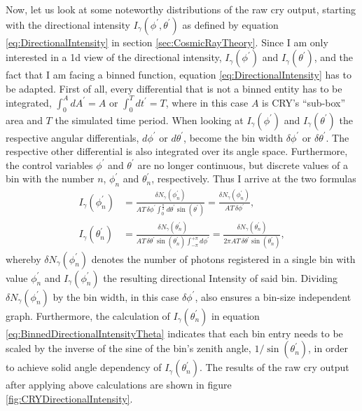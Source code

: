 Now, let us look at some noteworthy distributions of the raw \gls{cry} output, starting with the directional intensity $I_\gamma(\phi^{\prime},\theta^{\prime})$ as defined by equation \ref{eq:DirectionalIntensity} in section \ref{sec:CosmicRayTheory}. Since I am only interested in a \gls{1d} view of the directional intensity, \ie $I_\gamma(\phi^{\prime})$ and $I_\gamma(\theta^{\prime})$, and the fact that I am facing a binned function, equation \ref{eq:DirectionalIntensity} has to be adapted. First of all, every differential that is not a binned entity has to be integrated, \eg $\int_0^A dA^{\prime} = A$ or $\int_0^T dt^{\prime} = T$, where in this case $A$ is CRY's ``sub-box'' area and $T$ the simulated time period. When looking at $I_\gamma(\phi^{\prime})$ and $I_\gamma(\theta^{\prime})$ the respective angular differentials, $d\phi^{\prime}$ or $d\theta^{\prime}$, become the bin width $\delta\phi^{\prime}$ or $\delta\theta^{\prime}$. The respective other differential is also integrated over its angle space. Furthermore, the control variables $\phi^{\prime}$ and $\theta^{\prime}$ are no longer continuous, but discrete values of a bin with the number $n$, \ie $\phi^{\prime}_n$ and $\theta^{\prime}_n$, respectively. Thus I arrive at the two formulas
\begin{align}\label{eq:BinnedDirectionalIntensityPhi}
    I_\gamma(\phi^{\prime}_n) &= \frac{\delta N_\gamma(\phi^{\prime}_n)}{AT \, \delta\phi^{\prime} \int_{0}^{\frac{\pi}{2}}d\theta^{\prime}\sin{(\theta^{\prime})}} =\frac{\delta N_\gamma(\phi^{\prime}_n)}{AT \, \delta\phi^{\prime}}, \\[5pt]
    I_\gamma(\theta^{\prime}_n) &= \frac{\delta N_\gamma(\theta^{\prime}_n)}{AT\, \delta \theta^{\prime}\sin{(\theta^{\prime}_n)} \int_{-\pi}^{+\pi}d\phi^{\prime}} = \frac{\delta N_\gamma(\theta^{\prime}_n)}{2\pi AT\, \delta\theta^{\prime}\sin{(\theta^{\prime}_n)}},
    \label{eq:BinnedDirectionalIntensityTheta}
\end{align}
whereby $\delta N_\gamma(\phi^{\prime}_n)$ denotes the number of photons registered in a single bin with value $\phi^{\prime}_n$ and $I_\gamma(\phi^{\prime}_n)$ the resulting directional Intensity of said bin. Dividing $\delta N_\gamma(\phi^{\prime}_n)$ by the bin width, in this case $\delta\phi^{\prime}$, also ensures a bin-size independent graph. Furthermore, the calculation of $I_\gamma(\theta^{\prime}_n)$ in equation \ref{eq:BinnedDirectionalIntensityTheta} indicates that each bin entry needs to be scaled by the inverse of the sine of the bin's zenith angle, $1/\sin{(\theta^{\prime}_n)}$, in order to achieve solid angle dependency of $I_\gamma(\theta^{\prime}_n)$. The results of the raw \gls{cry} output after applying above calculations are shown in figure \ref{fig:CRYDirectionalIntensity}.
